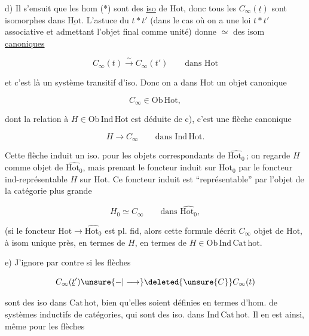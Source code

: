 
d) Il s'ensuit que les hom (*) sont des \uline{iso} de $\mathrm{Hot}$, donc tous les $C_\infty(\underline t)$ sont isomorphes dans $\underline{\mathrm{Hot}}$. L'astuce du $t*t'$ (dans le cas où on a une loi $t*t'$ associative et admettant l'objet final comme  unité) donne $\simeq$ des isom \uline{canoniques}

\[
C_\infty(t)\xrightarrow{\sim} C_\infty(t')\qquad\text{dans }\mathrm{Hot}
\]

et c'est là un système transitif d'iso. Donc on a dans $\mathrm{Hot}$ un objet  canonique

\[
C_\infty\in\mathrm{Ob}\,\mathrm{Hot},
\]

dont la relation à $H\in\mathrm{Ob}\,\mathrm{Ind\,Hot}$ est déduite de c), c'est une flèche canonique

\[
H\longrightarrow C_\infty\qquad\text{dans }\mathrm{Ind\,Hot}.
\]


Cette flèche induit un iso. pour les objets correspondants de $\widehat{\mathrm{Hot}_0}$\,;  on regarde $H$  comme  objet de $\widehat{\mathrm{Hot}_0}$, mais prenant le foncteur  induit sur $\mathrm{Hot}_0$ par le foncteur ind-représentable $H$ sur $\mathrm{Hot}$. Ce foncteur induit est ``représentable'' par l'objet  de la catégorie plus grande

\[
H_0\simeq C_\infty\qquad\text{dans }\widehat{\mathrm{Hot}_0},
\]

(si le foncteur  $\mathrm{Hot}\longrightarrow\widehat{\mathrm{Hot}_0}$ est pl. fid, alors cette formule décrit $C_\infty$  objet de $\mathrm{Hot}$, à isom unique près, en termes de $H$,   en termes de $H\in\mathrm{Ob}\,\mathrm{Ind\,Cat\,hot}$.


e) J'ignore par contre si les flèches

\[
C_\infty(\underline t')\unsure{-|\longrightarrow}\deleted{\unsure{C}}C_\infty(t)
\]

sont des iso dans $\mathrm{Cat\,hot}$, bien qu'elles soient définies en termes d'hom. de systèmes inductifs de catégories, qui sont des iso. dans $\mathrm{Ind\,Cat\,hot}$. Il en est ainsi, même pour les flèches 

